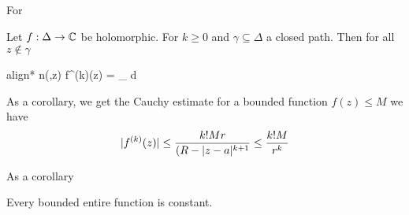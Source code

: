 \begin{theorem}
For
\end{theorem}



\begin{ntheorem}
	Let $f: \Delta \to \mathbb{C}$ be holomorphic. For $k \geq 0$ and $\gamma \subseteq \Delta$ a closed path. Then for all $z \notin \gamma$
	\begin{empheq}[box=\bluebase]{align*}
		n(\gamma,z) f^{(k)}(z) =  \int_{\gamma} d\xi
	\end{empheq}
\end{ntheorem}
As a corollary, we get the Cauchy estimate for a bounded function $f(z) \leq M$ we have
\begin{align*}
	\vert f^{(k)}(z)\vert \leq \frac{k!Mr}{(R - \vert z - a\vert^{k+1}} \leq \frac{k! M}{r^{k}}
\end{align*}

As a corollary
\begin{ntheorem}
	Every bounded entire function is constant.
\end{ntheorem}

